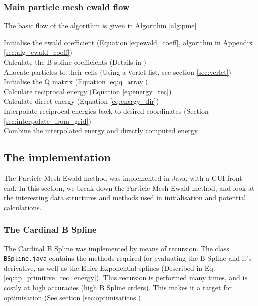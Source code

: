 \documentclass[pdftex,twoside,a4paper]{report}
\newcommand{\pmem}{Particle Mesh Ewald method}
\begin{document}
\subsubsection{Main particle mesh ewald flow}
The basic flow of the algorithm is given in Algorithm \ref{alg:pme} \newline
\begin{algorithm}[H]
\label{alg:pme}
\SetLine
{}
Initialise the ewald coefficient (Equation \ref{eq:ewald_coeff}, algorithm in Appendix \ref{sec:alg_ewald_coeff})\\
Calculate the B spline coefficients (Details in \cite{essmann:8577} \cite{lee05})\\
Allocate particles to their cells (Using a Verlet list, see section \ref{sec:verlet})\\
Initialise the Q matrix (Equation \ref{eq:q_array})\\
Calculate reciprocal energy (Equation \ref{eq:energy_rec})\\
Calculate direct energy (Equation \ref{eq:energy_dir})\\
Interpolate reciprocal energies back to desired coordinates (Section \ref{sec:interpolate_from_grid})\\
Combine the interpolated energy and directly computed energy
\caption{The Particle Mesh Ewald Method}
\end{algorithm}

\subsection{The implementation}
The \pmem{} was implemented in Java, with a GUI front end. In this section, we break down the \pmem{}, and look at the interesting data structures and methods used in initialisation and potential calculations.

\subsubsection{The Cardinal B Spline}
The Cardinal B Spline was implemented by means of recursion. The class \texttt{BSpline.java} contains the methods required for evaluating the B Spline and it's derivative, as well as the Euler Exponential splines (Described in Eq. \ref{eq:ap_primitive_rec_energy}). This recursion is performed many times, and is costly at high accuracies (high B Spline orders). This makes it a target for optimisation (See section \ref{sec:optimisations})
\end{document}
